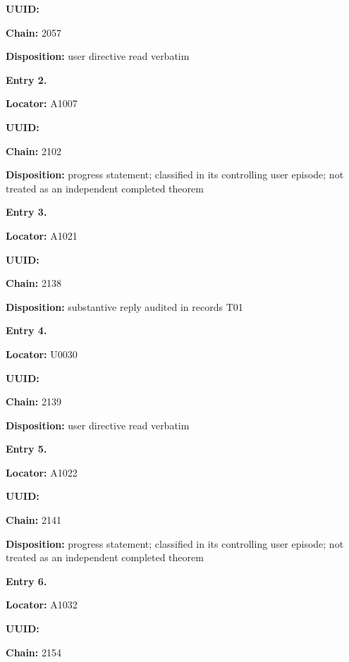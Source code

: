 \textbf{UUID:} \protect{}

\textbf{Chain:} 2057

\textbf{Disposition:} user directive read verbatim


\textbf{Entry 2.}

\textbf{Locator:} A1007

\textbf{UUID:} \protect{}

\textbf{Chain:} 2102

\textbf{Disposition:} progress statement; classified in its controlling
user episode; not treated as an independent completed theorem


\textbf{Entry 3.}

\textbf{Locator:} A1021

\textbf{UUID:} \protect{}

\textbf{Chain:} 2138

\textbf{Disposition:} substantive reply audited in records T01


\textbf{Entry 4.}

\textbf{Locator:} U0030

\textbf{UUID:} \protect{}

\textbf{Chain:} 2139

\textbf{Disposition:} user directive read verbatim


\textbf{Entry 5.}

\textbf{Locator:} A1022

\textbf{UUID:} \protect{}

\textbf{Chain:} 2141

\textbf{Disposition:} progress statement; classified in its controlling
user episode; not treated as an independent completed theorem


\textbf{Entry 6.}

\textbf{Locator:} A1032

\textbf{UUID:} \protect{}

\textbf{Chain:} 2154

